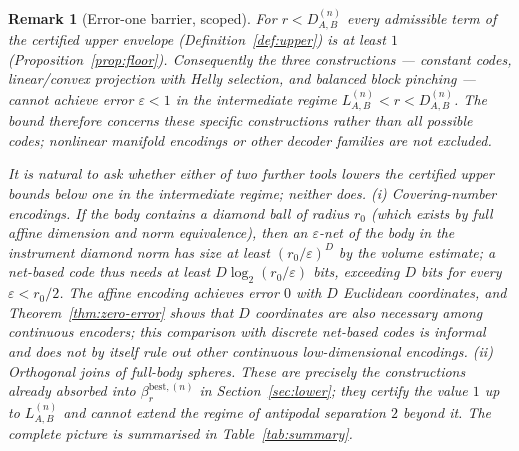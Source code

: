 \documentclass[11pt,a4paper]{article}
\newtheorem{remark}[theorem]{Remark}
\begin{document}
\begin{remark}[Error-one barrier, scoped]
\label{rem:barrier}
For $r<D_{A,B}^{(n)}$ every admissible term of the certified upper envelope (Definition~\ref{def:upper}) is at least $1$ (Proposition~\ref{prop:floor}). Consequently the three constructions --- constant codes, linear/convex projection with Helly selection, and balanced block pinching --- cannot achieve error $\varepsilon<1$ in the intermediate regime $L_{A,B}^{(n)}<r<D_{A,B}^{(n)}$. The bound therefore concerns these specific constructions rather than all possible codes; nonlinear manifold encodings or other decoder families are not excluded.

It is natural to ask whether either of two further tools lowers the certified upper bounds below one in the intermediate regime; neither does. (i) \emph{Covering-number encodings.} If the body contains a diamond ball of radius $r_0$ (which exists by full affine dimension and norm equivalence), then an $\varepsilon$-net of the body in the instrument diamond norm has size at least $(r_0/\varepsilon)^{D}$ by the volume estimate; a net-based code thus needs at least $D\log_2(r_0/\varepsilon)$ bits, exceeding $D$ bits for every $\varepsilon<r_0/2$. The affine encoding achieves error $0$ with $D$ Euclidean coordinates, and Theorem~\ref{thm:zero-error} shows that $D$ coordinates are also necessary among continuous encoders; this comparison with discrete net-based codes is informal and does not by itself rule out other continuous low-dimensional encodings. (ii) \emph{Orthogonal joins of full-body spheres.} These are precisely the constructions already absorbed into $\beta_r^{\mathrm{best},(n)}$ in Section~\ref{sec:lower}; they certify the value $1$ up to $L_{A,B}^{(n)}$ and cannot extend the regime of antipodal separation $2$ beyond it. The complete picture is summarised in Table~\ref{tab:summary}.
\end{remark}
\end{document}
